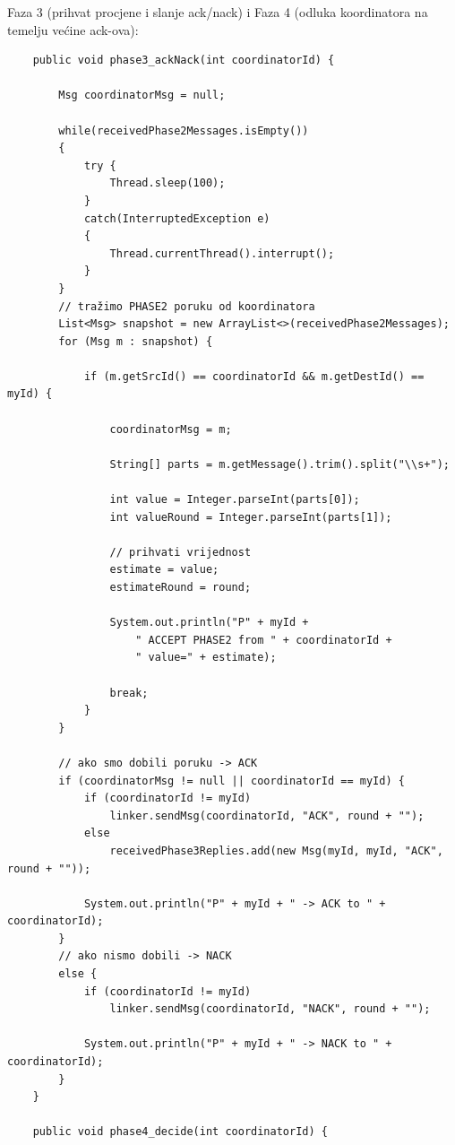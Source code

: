 \documentclass[11pt,a4paper]{article}
\begin{document}
Faza 3 (prihvat procjene i slanje ack/nack) i Faza 4 (odluka koordinatora na
temelju većine ack-ova):

\begin{lstlisting}
    public void phase3_ackNack(int coordinatorId) {

        Msg coordinatorMsg = null;

        while(receivedPhase2Messages.isEmpty())
        {
            try {
                Thread.sleep(100);
            }
            catch(InterruptedException e)
            {
                Thread.currentThread().interrupt();
            }
        }
        // tražimo PHASE2 poruku od koordinatora
        List<Msg> snapshot = new ArrayList<>(receivedPhase2Messages);
        for (Msg m : snapshot) {

            if (m.getSrcId() == coordinatorId && m.getDestId() == myId) {

                coordinatorMsg = m;

                String[] parts = m.getMessage().trim().split("\\s+");

                int value = Integer.parseInt(parts[0]);
                int valueRound = Integer.parseInt(parts[1]);

                // prihvati vrijednost
                estimate = value;
                estimateRound = round;

                System.out.println("P" + myId +
                    " ACCEPT PHASE2 from " + coordinatorId +
                    " value=" + estimate);

                break;
            }
        }

        // ako smo dobili poruku -> ACK
        if (coordinatorMsg != null || coordinatorId == myId) {
            if (coordinatorId != myId)
                linker.sendMsg(coordinatorId, "ACK", round + "");
            else
                receivedPhase3Replies.add(new Msg(myId, myId, "ACK", round + ""));

            System.out.println("P" + myId + " -> ACK to " + coordinatorId);
        }
        // ako nismo dobili -> NACK
        else {
            if (coordinatorId != myId)
                linker.sendMsg(coordinatorId, "NACK", round + "");

            System.out.println("P" + myId + " -> NACK to " + coordinatorId);
        }
    }

    public void phase4_decide(int coordinatorId) {


\end{lstlisting}
\end{document}
